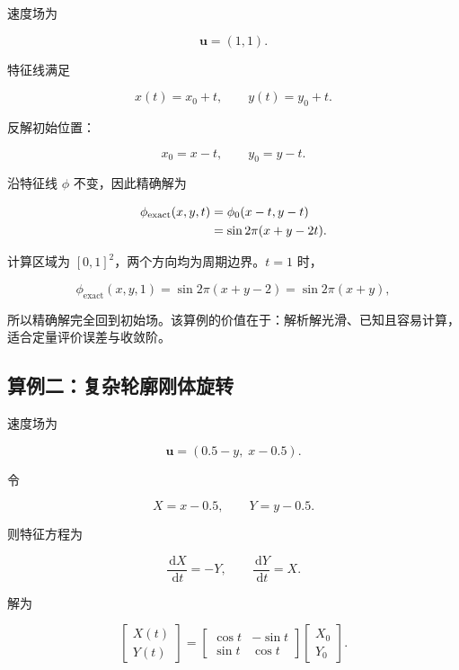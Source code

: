\documentclass[UTF8,12pt,a4paper,fontset=fandol]{ctexart}
\numberwithin{equation}{section}
\newcommand{\dd}{\,\mathrm d}
\begin{document}
速度场为

\begin{equation}
  \bm u=(1,1).
\end{equation}

特征线满足

\begin{equation}
  x(t)=x_0+t,
  \qquad
  y(t)=y_0+t.
\end{equation}

反解初始位置：

\begin{equation}
  x_0=x-t,
  \qquad
  y_0=y-t.
\end{equation}

沿特征线 $\phi$ 不变，因此精确解为

\begin{align}
  \phi_{\mathrm{exact}}(x,y,t)
  &=\phi_0(x-t,y-t)\notag\\
  &=\sin 2\pi(x+y-2t).
  \label{eq:sine_exact}
\end{align}

计算区域为 $[0,1]^2$，两个方向均为周期边界。$t=1$ 时，

\begin{equation}
  \phi_{\mathrm{exact}}(x,y,1)
  =
  \sin 2\pi(x+y-2)
  =
  \sin 2\pi(x+y),
\end{equation}

所以精确解完全回到初始场。该算例的价值在于：解析解光滑、已知且容易计算，适合定量评价误差与收敛阶。

\subsection{算例二：复杂轮廓刚体旋转}

速度场为

\begin{equation}
  \bm u=(0.5-y,\;x-0.5).
  \label{eq:rotation_velocity}
\end{equation}

令

\begin{equation}
  X=x-0.5,
  \qquad
  Y=y-0.5.
\end{equation}

则特征方程为

\begin{equation}
  \frac{\dd X}{\dd t}=-Y,
  \qquad
  \frac{\dd Y}{\dd t}=X.
\end{equation}

解为

\begin{equation}
  \begin{bmatrix}X(t)\\Y(t)\end{bmatrix}
  =
  \begin{bmatrix}
  \cos t&-\sin t\\
  \sin t&\cos t
  \end{bmatrix}
  \begin{bmatrix}X_0\\Y_0\end{bmatrix}.
\end{equation}
\end{document}
